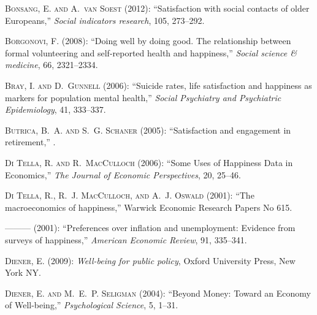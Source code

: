 \documentclass[10pt, letterpaper]{article}
\begin{document}
\begin{spacing}{1.4}
\begin{spacing}{.9}
\begin{thebibliography}{71}
\textsc{Bonsang, E. and A.~van Soest} (2012): \enquote{Satisfaction with social
  contacts of older Europeans,} \emph{Social indicators research}, 105,
  273--292.

\textsc{Borgonovi, F.} (2008): \enquote{Doing well by doing good. The
  relationship between formal volunteering and self-reported health and
  happiness,} \emph{Social science \& medicine}, 66, 2321--2334.

\textsc{Bray, I. and D.~Gunnell} (2006): \enquote{Suicide rates, life
  satisfaction and happiness as markers for population mental health,}
  \emph{Social Psychiatry and Psychiatric Epidemiology}, 41, 333--337.

\textsc{Butrica, B.~A. and S.~G. Schaner} (2005): \enquote{Satisfaction and
  engagement in retirement,} .

\textsc{{Di Tella}, R. and R.~MacCulloch} (2006): \enquote{Some Uses of
  Happiness Data in Economics,} \emph{The Journal of Economic Perspectives},
  20, 25--46.

\textsc{{Di Tella}, R., R.~J. MacCulloch, and A.~J. Oswald}
  (2001{}): \enquote{The macroeconomics of happiness,} Warwick
  Economic Research Papers No 615.

---\hspace{-.1pt}---\hspace{-.1pt}--- (2001{}):
  \enquote{Preferences over inflation and unemployment: Evidence from surveys
  of happiness,} \emph{American Economic Review}, 91, 335--341.

\textsc{Diener, E.} (2009): \emph{Well-being for public policy}, Oxford
  University Press, New York NY.

\textsc{Diener, E. and M.~E.~P. Seligman} (2004): \enquote{Beyond Money: Toward
  an Economy of Well-being,} \emph{Psychological Science}, 5, 1--31.


\end{thebibliography}
\end{spacing}
\end{spacing}
\end{document}
